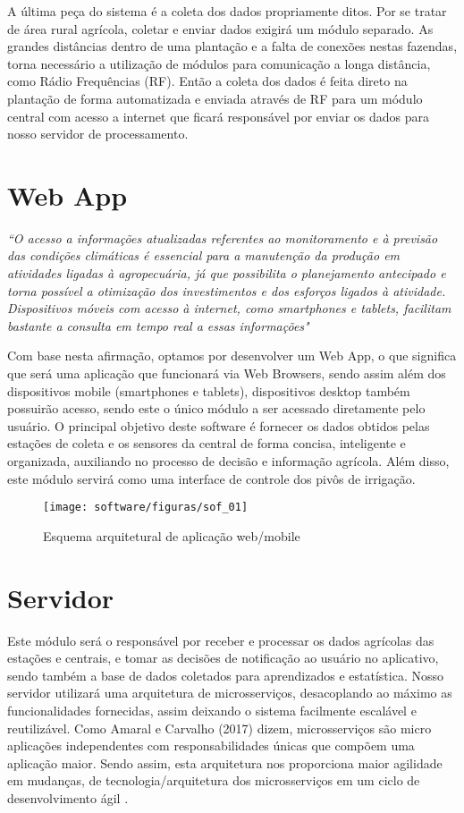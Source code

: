 A última peça do sistema é a coleta dos dados propriamente ditos. Por se tratar de área rural agrícola, coletar e enviar dados exigirá um módulo separado. As grandes distâncias dentro de uma plantação e a falta de conexões nestas fazendas, torna necessário a utilização de módulos para comunicação a longa distância, como Rádio Frequências (RF). Então a coleta dos dados é feita direto na plantação de forma automatizada e enviada através de RF para um módulo central com acesso a internet que ficará responsável por enviar os dados para nosso servidor de processamento. 


\section{Web App}

\textit{	``O acesso a informações atualizadas referentes ao monitoramento e à previsão das condições climáticas é essencial para a manutenção da produção em atividades ligadas à agropecuária, já que possibilita o planejamento antecipado e torna possível a otimização dos investimentos e dos esforços ligados à atividade. Dispositivos móveis com acesso à internet, como smartphones e tablets, facilitam bastante a consulta em tempo real a essas informações" }\cite{
sof_01}

	Com base nesta afirmação, optamos por desenvolver um Web App, o que significa que será uma aplicação que funcionará via Web Browsers, sendo assim além dos dispositivos mobile (smartphones e tablets), dispositivos desktop também possuirão acesso, sendo este o único módulo a ser acessado diretamente pelo usuário. O principal objetivo deste software é fornecer os dados obtidos pelas estações de coleta e os sensores da central de forma concisa, inteligente e organizada, auxiliando no processo de decisão e informação agrícola. Além disso, este módulo servirá como uma interface de controle dos pivôs de irrigação.

\begin{figure}[H]
	\centering
	\texttt{[image: software/figuras/sof\_01]}
	\caption{Esquema arquitetural de aplicação web/mobile}
\end{figure}


\section{Servidor}
	Este módulo será o responsável por receber e processar os dados agrícolas das estações e centrais, e tomar as decisões de notificação ao usuário no aplicativo, sendo também a base de dados coletados para aprendizados e estatística. 
Nosso servidor utilizará uma arquitetura de microsserviços, desacoplando ao máximo as funcionalidades fornecidas, assim deixando o sistema facilmente escalável e reutilizável. Como Amaral e Carvalho (2017) dizem, microsserviços são micro aplicações independentes com responsabilidades únicas que compõem uma aplicação maior. Sendo assim, esta arquitetura nos proporciona maior agilidade em mudanças, de tecnologia/arquitetura dos microsserviços em um ciclo de desenvolvimento ágil \cite{sof_02}.

